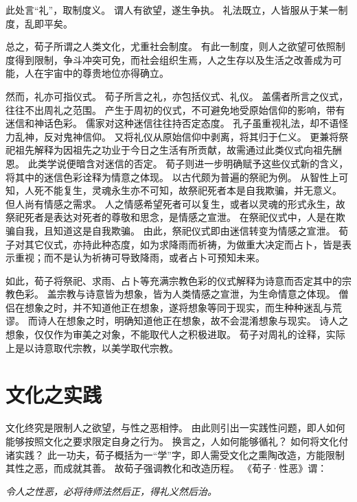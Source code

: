 \documentclass[11pt]{article}
\begin{document}
此处言“礼”，取制度义。
谓人有欲望，遂生争执。
礼法既立，人皆服从于某一制度，乱即平矣。

\newline

总之，荀子所谓之人类文化，尤重社会制度。
有此一制度，则人之欲望可依照制度得到限制，争斗冲突可免，而社会组织生焉，人之生存以及生活之改善成为可能，人在宇宙中的尊贵地位亦得确立。

\newline

然而，礼亦可指仪式。
荀子所言之礼，亦包括仪式、礼仪。
盖儒者所言之仪式，往往不出周礼之范围。
产生于周初的仪式，不可避免地受原始信仰的影响，带有迷信和神话色彩。
儒家对这种迷信往往持否定态度。
孔子虽重视礼法，却不语怪力乱神，反对鬼神信仰。
又将礼仪从原始信仰中剥离，将其归于仁义。
更兼将祭祀祖先解释为因祖先之功业于今日之生活有所贡献，故需通过此类仪式向祖先酬恩。
此类学说便暗含对迷信的否定。
荀子则进一步明确赋予这些仪式新的含义，将其中的迷信色彩诠释为情意之体现。
以古代颇为普遍的祭祀为例。
从智性上可知，人死不能复生，灵魂永生亦不可知，故祭祀死者本是自我欺骗，并无意义。
但人尚有情感之需求。
人之情感希望死者可以复生，或者以灵魂的形式永生，故祭祀死者是表达对死者的尊敬和思念，是情感之宣泄。
在祭祀仪式中，人是在欺骗自我，且知道这是自我欺骗。
由此，祭祀仪式即由迷信转变为情感之宣泄。
荀子对其它仪式，亦持此种态度，如为求降雨而祈祷，为做重大决定而占卜，皆是表示重视；而不是认为祈祷可导致降雨，或者占卜可预知未来。

\newline

如此，荀子将祭祀、求雨、占卜等充满宗教色彩的仪式解释为诗意而否定其中的宗教色彩。
盖宗教与诗意皆为想象，皆为人类情感之宣泄，为生命情意之体现。
僧侣在想象之时，并不知道他正在想象，遂将想象等同于现实，而生种种迷乱与荒谬。
而诗人在想象之时，明确知道他正在想象，故不会混淆想象与现实。
诗人之想象，仅仅作为审美之对象，不能取代人之积极进取。
荀子对周礼的诠释，实际上是以诗意取代宗教，以美学取代宗教。

\section{文化之实践}
文化终究是限制人之欲望，与性之恶相悖。
由此则引出一实践性问题，即人如何能够按照文化之要求限定自身之行为。
换言之，人如何能够循礼？
如何将文化付诸实践？
此一功夫，荀子概括为一“学”字，即人需受文化之熏陶改造，方能限制其性之恶，而成就其善。
故荀子强调教化和改造历程。
《荀子·性恶》谓：

\textit{令人之性恶，必将待师法然后正，得礼义然后治。}
\end{document}
